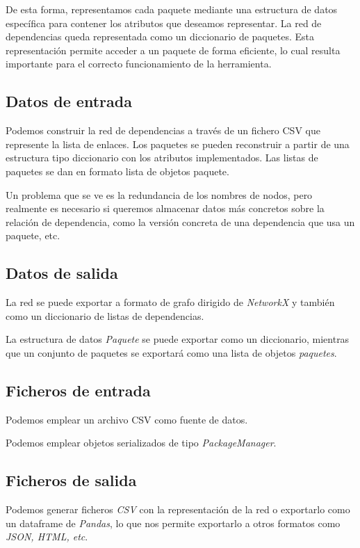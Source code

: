 De esta forma, representamos cada paquete mediante una estructura de datos específica para
contener los atributos que deseamos representar. La red de dependencias queda representada
como un diccionario de paquetes. Esta representación permite acceder a un paquete de forma
eficiente, lo cual resulta importante para el correcto funcionamiento de la herramienta.

\subsection{Datos de entrada}

Podemos construir la red de dependencias a través de un fichero CSV que represente la lista
de enlaces. Los paquetes se pueden reconstruir a partir de una estructura tipo diccionario
con los atributos implementados. Las listas de paquetes se dan en formato lista de objetos
paquete.

Un problema que se ve es la redundancia de los nombres de nodos, pero realmente es necesario
si queremos almacenar datos más concretos sobre la relación de dependencia, como la versión
concreta de una dependencia que usa un paquete, etc.

\subsection{Datos de salida}
La red se puede exportar a formato de grafo dirigido de \textit{NetworkX} y también como
un diccionario de listas de dependencias.

La estructura de datos \textit{Paquete} se puede exportar como un diccionario, mientras
que un conjunto de paquetes se exportará como una lista de objetos \textit{paquetes}.

\subsection{Ficheros de entrada}
Podemos emplear un archivo CSV como fuente de datos.

Podemos emplear objetos serializados de tipo \textit{PackageManager}.

\subsection{Ficheros de salida}
Podemos generar ficheros \textit{CSV} con la representación de la red o exportarlo como un dataframe de \textit{Pandas},
lo que nos permite exportarlo a otros formatos como \textit{JSON, HTML, etc}.

